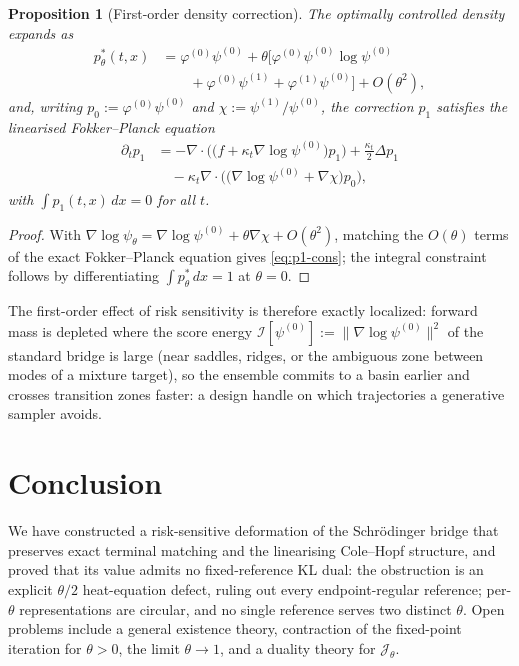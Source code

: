 \documentclass[letterpaper,10pt,conference]{IEEEtran}
\newtheorem{proposition}{Proposition}
\newcommand{\cJ}{\mathcal{J}}
\begin{document}
	\begin{proposition}[First-order density correction]
		\label{prop:first-order}
		The optimally controlled density expands as
		\begin{equation}
			\label{eq:p1}
			\begin{split}
				p_\theta^*(t,x)&=\varphi^{(0)}\psi^{(0)}
				+\theta\bigl[\varphi^{(0)}\psi^{(0)}\log\psi^{(0)}\\
				&\qquad+\varphi^{(0)}\psi^{(1)}+\varphi^{(1)}\psi^{(0)}\bigr]
				+O(\theta^2),
			\end{split}
		\end{equation}
		and, writing $p_0:=\varphi^{(0)}\psi^{(0)}$ and $\chi:=\psi^{(1)}/\psi^{(0)}$, the
		correction $p_1$ satisfies the linearised Fokker--Planck equation
		\begin{equation}
			\label{eq:p1-cons}
			\begin{split}
				\partial_t p_1&=-\nabla\cdot\bigl(\bigl(f+\kappa_t\nabla\log\psi^{(0)}\bigr)p_1\bigr)
				+\tfrac{\kappa_t}{2}\Delta p_1\\
				&\quad-\kappa_t\nabla\cdot\bigl(\bigl(\nabla\log\psi^{(0)}+\nabla\chi\bigr)p_0\bigr),
			\end{split}
		\end{equation}
		with $\int p_1(t,x)\,dx=0$ for all $t$.
	\end{proposition}
	
	\begin{proof}
		With
		$\nabla\log\psi_\theta=\nabla\log\psi^{(0)}+\theta\nabla\chi+O(\theta^2)$,
		matching the $O(\theta)$ terms of the exact Fokker--Planck equation gives
		\eqref{eq:p1-cons}; the integral constraint follows by differentiating
		$\int p_\theta^*\,dx=1$ at $\theta=0$.
	\end{proof}
	
	The first-order effect of risk sensitivity is therefore exactly localized:
	forward mass is depleted where the {score energy}
	$\mathcal I[\psi^{(0)}]:=\|\nabla\log\psi^{(0)}\|^2$ of the standard bridge is large (near saddles, ridges, or the ambiguous zone between modes of a mixture target), so the ensemble commits to a basin earlier and crosses
	transition zones faster: a design handle on which trajectories a generative
	sampler avoids.
	
	\section{Conclusion}
	\label{sec:conclusion}
	
	We have constructed a risk-sensitive deformation of the Schr\"odinger bridge
	that preserves exact terminal matching and the linearising Cole--Hopf
	structure, and proved that its value admits no fixed-reference KL dual: the
	obstruction is an explicit $\theta/2$ heat-equation defect, ruling out every
	endpoint-regular reference; per-$\theta$ representations are circular, and no
	single reference serves two distinct $\theta$. Open problems include a general existence theory,
	contraction of the fixed-point iteration for $\theta>0$, the limit
	$\theta\to1$, and a duality theory for $\cJ_\theta$.
	
\end{document}
